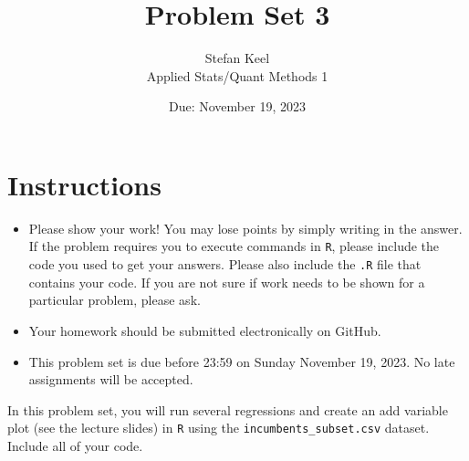 \documentclass[12pt,letterpaper]{article}
\title{Problem Set 3}
\date{Due: November 19, 2023}
\author{Stefan Keel \\
	 Applied Stats/Quant Methods 1}
\begin{document}
	\maketitle
	\section*{Instructions}
	\begin{itemize}
		\item Please show your work! You may lose points by simply writing in the answer. If the problem requires you to execute commands in \texttt{R}, please include the code you used to get your answers. Please also include the \texttt{.R} file that contains your code. If you are not sure if work needs to be shown for a particular problem, please ask.
	\item Your homework should be submitted electronically on GitHub.
	\item This problem set is due before 23:59 on Sunday November 19, 2023. No late assignments will be accepted.

	\end{itemize}

		\vspace{.25cm}
	
\noindent In this problem set, you will run several regressions and create an add variable plot (see the lecture slides) in \texttt{R} using the \texttt{incumbents\_subset.csv} dataset. Include all of your code.

	\vspace{.5cm}
	
\end{document}
